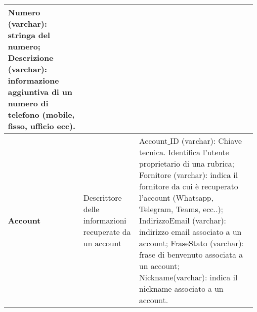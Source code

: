 \begin{longtable}{p{}p{}p{}}
Numero (varchar): stringa del numero;\newline
Descrizione (varchar): informazione aggiuntiva di un numero di telefono (mobile, fisso, ufficio ecc).
\\ \midrule
\textbf{Account} &
Descrittore delle informazioni recuperate da un account &
Account$\_$ID (varchar): Chiave tecnica. Identifica l’utente proprietario di una rubrica;\newline
Fornitore (varchar): indica il fornitore da cui è recuperato l'account (Whatsapp, Telegram, Teams, ecc..);\newline
IndirizzoEmail (varchar): indirizzo email associato a un account;\newline
FraseStato (varchar): frase di benvenuto associata a un account;\newline
Nickname(varchar): indica il nickname associato a un account.
\\ \bottomrule
\end{longtable}
\clearpage

